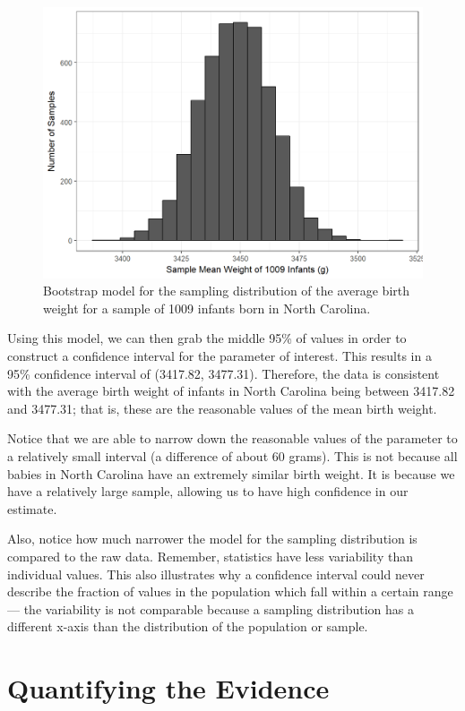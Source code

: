 \documentclass[]{book}
\theoremstyle{plain}
\theoremstyle{mydefn}
\theoremstyle{myexmpl}
\theoremstyle{remark}
\begin{document}
\begin{figure}

{\centering \includegraphics[width=0.8\linewidth]{./Images/singleconfint-samp-distn-1} 

}

\caption{Bootstrap model for the sampling distribution of the average birth weight for a sample of 1009 infants born in North Carolina.}\label{fig:singleconfint-samp-distn}
\end{figure}

Using this model, we can then grab the middle 95\% of values in order to
construct a confidence interval for the parameter of interest. This
results in a 95\% confidence interval of (3417.82, 3477.31). Therefore,
the data is consistent with the average birth weight of infants in North
Carolina being between 3417.82 and 3477.31; that is, these are the
reasonable values of the mean birth weight.

Notice that we are able to narrow down the reasonable values of the
parameter to a relatively small interval (a difference of about 60
grams). This is not because all babies in North Carolina have an
extremely similar birth weight. It is because we have a relatively large
sample, allowing us to have high confidence in our estimate.

Also, notice how much narrower the model for the sampling distribution
is compared to the raw data. Remember, statistics have less variability
than individual values. This also illustrates why a confidence interval
could never describe the fraction of values in the population which fall
within a certain range --- the variability is not comparable because a
sampling distribution has a different x-axis than the distribution of
the population or sample.

\chapter{Quantifying the Evidence}\label{SingleTeststat}
\end{document}
